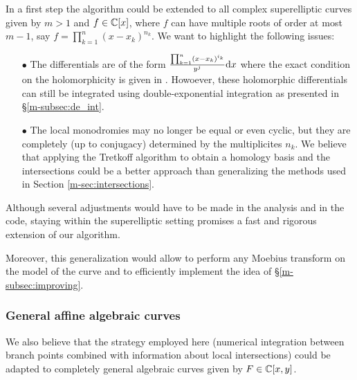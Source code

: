 \documentclass[main.tex]{subfiles}
\begin{document}
  In a first step the algorithm could be
  extended to all complex superelliptic curves given by $m > 1$ and $f \in
  \mathbb{C}[x]$, where $f$ can have multiple roots of order at most $m-1$, say 
  $f = \prod_{k=1}^n (x-x_k)^{n_k}$.
  We want to highlight the following issues:
  \begin{itemize}
   \item[$\bullet$] The differentials are of the form
   $\frac{\prod_{k=1}^n (x-x_k)^{i_k}}{y^j}\mathrm d x$
    where the exact condition on the holomorphicity is given in \cite[Theorem 3]{Koo1991}.
   Howoever, these holomorphic differentials can still be integrated using double-exponential integration as presented
   in \S \ref{m-subsec:de_int}.
   \item[$\bullet$] The local monodromies may no longer be equal or even cyclic, but they are completely (up
   to conjugacy) determined
   by the multiplicites $n_k$. We believe that applying the Tretkoff algorithm \cite{TT1984}
   to obtain a homology basis and the intersections could be a better approach than generalizing the methods
   used in Section \ref{m-sec:intersections}.
  \end{itemize}

  Although several adjustments would have to be made in the analysis and in the
  code, staying within the superelliptic setting promises
  a fast and rigorous extension of our algorithm. 

  Moreover, this generalization would allow to perform any Moebius transform on the
  model of the curve and to efficiently implement the idea of \S \ref{m-subsec:improving}.

  \subsubsection{General affine algebraic curves}
  
  We also believe that the strategy employed here (numerical integration between
  branch points combined with information about local intersections) could
  be adapted to completely general algebraic curves given by $F \in \mathbb{C}[x,y]$.
\end{document}
